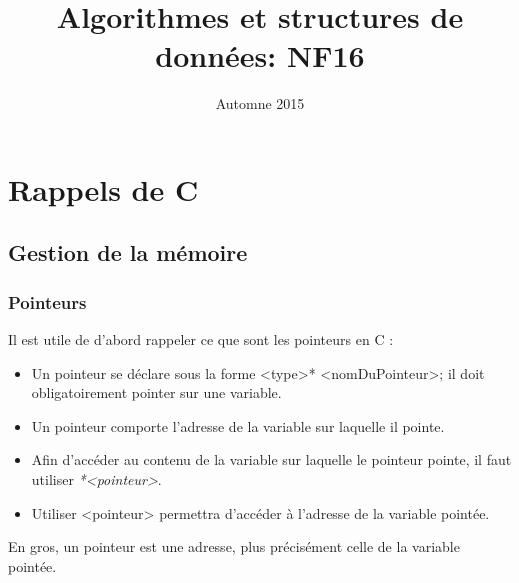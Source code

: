 \documentclass{report}
\title{Algorithmes et structures de données: \textbf{NF16}}
\date{Automne 2015}
\begin{document}
\maketitle{}

\tableofcontents

\chapter{Rappels de C}
\section{Gestion de la mémoire}
\subsection{Pointeurs}
Il est utile de d'abord rappeler ce que sont les pointeurs en C :
\begin{itemize}
\item{Un pointeur se déclare sous la forme <type>* <nomDuPointeur>; il doit obligatoirement pointer sur une variable.}
\item{Un pointeur comporte l'adresse de la variable sur laquelle il pointe.}
\item{Afin d'accéder au contenu de la variable sur laquelle le pointeur pointe, il faut utiliser \emph{*<pointeur>}}.
\item{Utiliser <pointeur> permettra d'accéder à l'adresse de la variable pointée.}
\end{itemize}
En gros, un pointeur est une adresse, plus précisément celle de la variable pointée.
\end{document}
